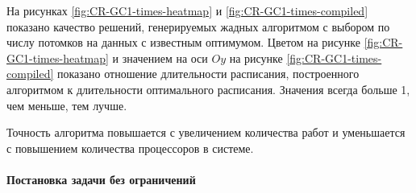 На рисунках \ref{fig:CR-GC1-times-heatmap} и \ref{fig:CR-GC1-times-compiled} показано качество решений, генерируемых жадных алгоритмом с выбором по числу потомков на данных с известным оптимумом. Цветом на рисунке \ref{fig:CR-GC1-times-heatmap} и значением на оси $Oy$ на рисунке \ref{fig:CR-GC1-times-compiled} показано отношение длительности расписания, построенного алгоритмом к длительности оптимального расписания. Значения всегда больше 1, чем меньше, тем лучше.

Точность алгоритма повышается с увеличением количества работ и уменьшается с повышением количества процессоров в системе. 




\paragraph{Постановка задачи без ограничений}

